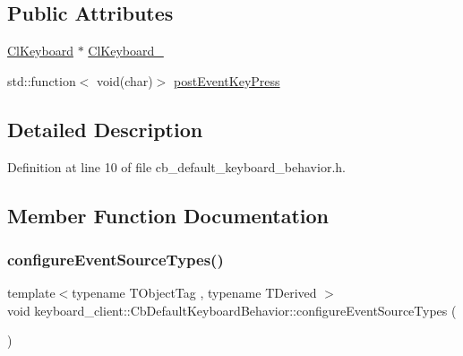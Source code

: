 \subsection*{Public Attributes}
\begin{DoxyCompactItemize}
\item 
\hyperlink{classkeyboard__client_1_1ClKeyboard}{Cl\+Keyboard} $\ast$ \hyperlink{classkeyboard__client_1_1CbDefaultKeyboardBehavior_a17c088cabe2d686f227d2a6368629993}{Cl\+Keyboard\+\_\+}
\item 
std\+::function$<$ void(char)$>$ \hyperlink{classkeyboard__client_1_1CbDefaultKeyboardBehavior_ac3a5e8c2cca0fd4117ddc192858d3771}{post\+Event\+Key\+Press}
\end{DoxyCompactItemize}


\subsection{Detailed Description}


Definition at line 10 of file cb\+\_\+default\+\_\+keyboard\+\_\+behavior.\+h.



\subsection{Member Function Documentation}
\mbox{\label{classkeyboard__client_1_1CbDefaultKeyboardBehavior_a70465c0886d118d226d136a4acc63ef3}} 
\subsubsection{\texorpdfstring{configure\+Event\+Source\+Types()}{configureEventSourceTypes()}}
{\footnotesize\ttfamily template$<$typename T\+Object\+Tag , typename T\+Derived $>$ \\
void keyboard\+\_\+client\+::\+Cb\+Default\+Keyboard\+Behavior\+::configure\+Event\+Source\+Types (\begin{DoxyParamCaption}{ }\end{DoxyParamCaption})\hspace{0.3cm}{\ttfamily [inline]}}



